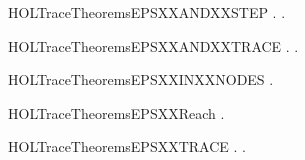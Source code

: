 \begin{SaveVerbatim}{HOLTraceTheoremsEPSXXANDXXSTEP}
\HOLTokenTurnstile{} \HOLSymConst{\HOLTokenForall{}} .    \HOLSymConst{\HOLTokenImp{}} \HOLSymConst{\HOLTokenExists{}}.    
\end{SaveVerbatim}
\newcommand{\HOLTraceTheoremsEPSXXANDXXSTEP}{\UseVerbatim{HOLTraceTheoremsEPSXXANDXXSTEP}}
\begin{SaveVerbatim}{HOLTraceTheoremsEPSXXANDXXTRACE}
\HOLTokenTurnstile{} \HOLSymConst{\HOLTokenForall{}} .    \HOLSymConst{\HOLTokenEquiv{}} \HOLSymConst{\HOLTokenExists{}}.     \HOLSymConst{\HOLTokenConj{}}  
\end{SaveVerbatim}
\newcommand{\HOLTraceTheoremsEPSXXANDXXTRACE}{\UseVerbatim{HOLTraceTheoremsEPSXXANDXXTRACE}}
\begin{SaveVerbatim}{HOLTraceTheoremsEPSXXINXXNODES}
\HOLTokenTurnstile{} \HOLSymConst{\HOLTokenForall{}} .    \HOLSymConst{\HOLTokenImp{}}  \HOLConst{\HOLTokenIn{}}  
\end{SaveVerbatim}
\newcommand{\HOLTraceTheoremsEPSXXINXXNODES}{\UseVerbatim{HOLTraceTheoremsEPSXXINXXNODES}}
\begin{SaveVerbatim}{HOLTraceTheoremsEPSXXReach}
\HOLTokenTurnstile{} \HOLSymConst{\HOLTokenForall{}} .    \HOLSymConst{\HOLTokenImp{}}   
\end{SaveVerbatim}
\newcommand{\HOLTraceTheoremsEPSXXReach}{\UseVerbatim{HOLTraceTheoremsEPSXXReach}}
\begin{SaveVerbatim}{HOLTraceTheoremsEPSXXTRACE}
\HOLTokenTurnstile{} \HOLSymConst{\HOLTokenForall{}} .    \HOLSymConst{\HOLTokenImp{}} \HOLSymConst{\HOLTokenExists{}}.    
\end{SaveVerbatim}
\newcommand{\HOLTraceTheoremsEPSXXTRACE}{\UseVerbatim{HOLTraceTheoremsEPSXXTRACE}}
